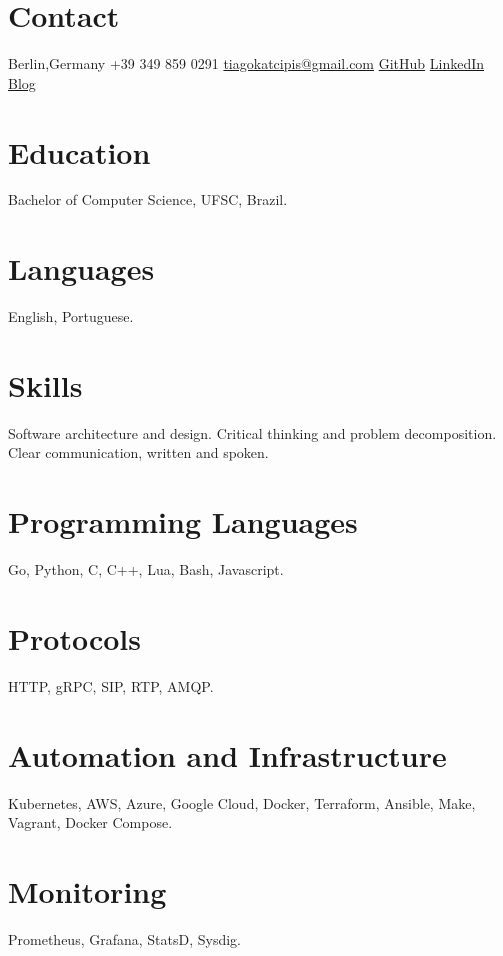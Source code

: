 \documentclass[]{friggeri-cv} %
\begin{document}


\begin{aside} %
\section{Contact}
Berlin,Germany
+39 349 859 0291
\href{mailto:tiagokatcipis@gmail.com}{tiagokatcipis@gmail.com}
\href{https://github.com/katcipis}{GitHub}
\href{http://www.linkedin.com/pub/tiago-katcipis/1b/273/8b0}{LinkedIn}
\href{http://katcipis.github.io/}{Blog}
\section{Education}
Bachelor of Computer Science, UFSC, Brazil.
\section{Languages}
English, Portuguese.
\section{Skills}
Software architecture and design.
Critical thinking and problem decomposition.
Clear communication, written and spoken.
\section{Programming Languages}
Go, Python, C, C++, Lua, Bash, Javascript.
\section{Protocols}
HTTP, gRPC, SIP, RTP, AMQP.
\section{Automation and Infrastructure}
Kubernetes, AWS, Azure, Google Cloud, Docker, Terraform,
Ansible, Make, Vagrant, Docker Compose.
\section{Monitoring}
Prometheus, Grafana, StatsD, Sysdig.
\end{aside}
\end{document}
